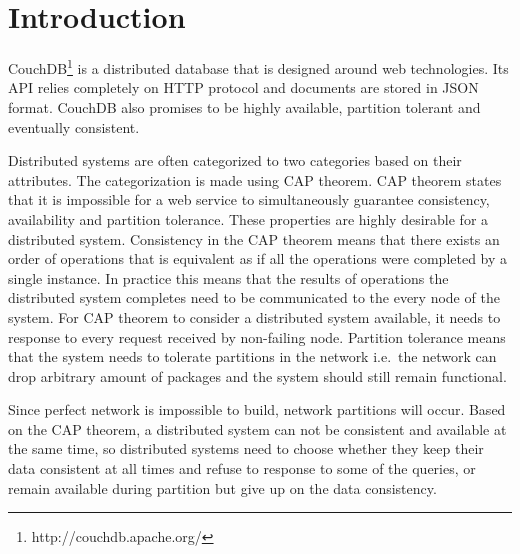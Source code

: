 \section{Introduction}

CouchDB\footnote{http://couchdb.apache.org/} is a distributed database that is
designed around web technologies. Its API relies completely on HTTP protocol and
documents are stored in JSON format. CouchDB also promises to be highly
available, partition tolerant and eventually consistent.

Distributed systems are often categorized to two categories based on their
attributes. The categorization is made using CAP
theorem\cite{gilbert2002brewer}. CAP theorem states that it is impossible for a
web service to simultaneously guarantee consistency, availability and partition
tolerance. These properties are highly desirable for a distributed system.
Consistency in the CAP theorem means that there exists an order of operations
that is equivalent as if all the operations were completed by a single
instance. In practice this means that the results of operations the distributed
system completes need to be communicated to the every node of the system. For
CAP theorem to consider a distributed system available, it needs to response to
every request received by non-failing node. Partition tolerance means that the
system needs to tolerate partitions in the network i.e.\ the network
can drop arbitrary amount of packages and the system should still remain
functional. 

Since perfect network is impossible to build, network partitions will occur.
Based on the CAP theorem, a distributed system can not be consistent and
available at the same time, so distributed systems need to choose whether they
keep their data consistent at all times and refuse to response to some of the
queries, or remain available during partition but give up on the data
consistency.

